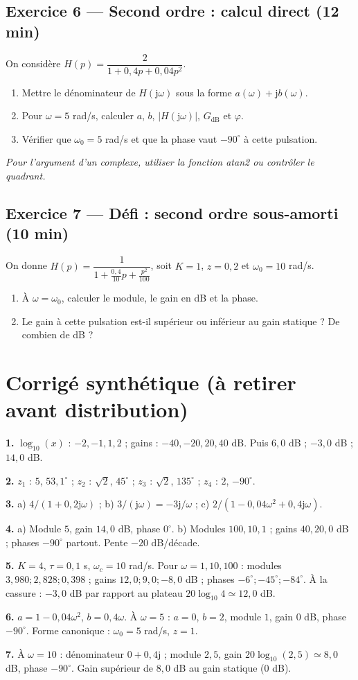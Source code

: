 \documentclass[11pt,a4paper]{article}
\newcommand{\dd}{\mathrm{dB}}
\newcommand{\jw}{\mathrm{j}\omega}
\newcommand{\ex}[2]{\subsection*{Exercice #1 --- #2}}
\begin{document}
\ex{6}{Second ordre : calcul direct (12 min)}
On considère \(H(p)=\dfrac{2}{1+0{,}4p+0{,}04p^2}\).
\begin{enumerate}[label=\alph*)]
\item Mettre le dénominateur de $H(\jw)$ sous la forme $a(\omega)+\mathrm{j}b(\omega)$.
\item Pour $\omega=5$ rad/s, calculer $a$, $b$, $|H(\jw)|$, $G_{\dd}$ et $\varphi$.
\item Vérifier que $\omega_0=5$ rad/s et que la phase vaut $-90^\circ$ à cette pulsation.
\end{enumerate}
\textit{Pour l'argument d'un complexe, utiliser la fonction atan2 ou contrôler le quadrant.}

\ex{7}{Défi : second ordre sous-amorti (10 min)}
On donne \(H(p)=\dfrac{1}{1+\frac{0{,}4}{10}p+\frac{p^2}{100}}\), soit $K=1$, $z=0{,}2$ et $\omega_0=10$ rad/s.
\begin{enumerate}[label=\alph*)]
\item À $\omega=\omega_0$, calculer le module, le gain en dB et la phase.
\item Le gain à cette pulsation est-il supérieur ou inférieur au gain statique ? De combien de dB ?
\end{enumerate}

\newpage
\section*{Corrigé synthétique (à retirer avant distribution)}
\textbf{1.} $\log_{10}(x)$ : $-2,-1,1,2$ ; gains : $-40,-20,20,40$ dB. Puis $6{,}0$ dB ; $-3{,}0$ dB ; $14{,}0$ dB.

\textbf{2.} $z_1$ : $5$, $53{,}1^\circ$ ; $z_2$ : $\sqrt2$, $45^\circ$ ; $z_3$ : $\sqrt2$, $135^\circ$ ; $z_4$ : $2$, $-90^\circ$.

\textbf{3.} a) $4/(1+0{,}2\mathrm{j}\omega)$ ; b) $3/(\mathrm{j}\omega)=-3\mathrm{j}/\omega$ ; c) $2/(1-0{,}04\omega^2+0{,}4\mathrm{j}\omega)$.

\textbf{4.} a) Module $5$, gain $14{,}0$ dB, phase $0^\circ$. b) Modules $100,10,1$ ; gains $40,20,0$ dB ; phases $-90^\circ$ partout. Pente $-20$ dB/décade.

\textbf{5.} $K=4$, $\tau=0{,}1$ s, $\omega_c=10$ rad/s. Pour $\omega=1,10,100$ : modules $3{,}980;2{,}828;0{,}398$ ; gains $12{,}0;9{,}0;-8{,}0$ dB ; phases $-6^\circ;-45^\circ;-84^\circ$. À la cassure : $-3{,}0$ dB par rapport au plateau $20\log_{10}4\simeq12{,}0$ dB.

\textbf{6.} $a=1-0{,}04\omega^2$, $b=0{,}4\omega$. À $\omega=5$ : $a=0$, $b=2$, module $1$, gain $0$ dB, phase $-90^\circ$. Forme canonique : $\omega_0=5$ rad/s, $z=1$.

\textbf{7.} À $\omega=10$ : dénominateur $0+0{,}4\mathrm{j}$ ; module $2{,}5$, gain $20\log_{10}(2{,}5)\simeq 8{,}0$ dB, phase $-90^\circ$. Gain supérieur de $8{,}0$ dB au gain statique ($0$ dB).
\end{document}
